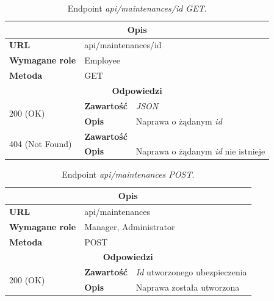 \documentclass[eng,printmode,openany]{mgr}
\begin{document}
\begin{table}[H]
	\caption{Endpoint \textit{api/maintenances/id GET}.}
	\begin{tabularx}{\textwidth}{|l|l|X|}
		\hline
		\multicolumn{3}{|c|}{\textbf{\textbf{Opis}}}
		\\ \hline
		\textbf{URL}                         & \multicolumn{2}{l|}{api/maintenances/id}
		\\ \hline
		\textbf{Wymagane role}               & \multicolumn{2}{l|}{Employee}
		\\ \hline
		\textbf{Metoda}                      & \multicolumn{2}{l|}{GET}
		\\ \hline
		\multicolumn{3}{|c|}{\textbf{Odpowiedzi}}
		\\ \hline
		\multirow{2}{*}{200 (OK)} 	        & \textbf{Zawartość}   	& \textit{JSON}
		\\ \cline{2-3}                      & \textbf{Opis}         	& Naprawa o żądanym \textit{id}
		\\ \hline
		\multirow{2}{*}{404 (Not Found)} 	& \textbf{Zawartość}     & 
		\\ \cline{2-3}                      & \textbf{Opis}          & Naprawa o żądanym \textit{id} nie istnieje
		\\ \hline
	\end{tabularx}
\end{table}

\begin{table}[H]
	\caption{Endpoint \textit{api/maintenances POST}.}
	\begin{tabularx}{\textwidth}{|l|l|X|}
		\hline
		\multicolumn{3}{|c|}{\textbf{\textbf{Opis}}}
		\\ \hline
		\textbf{URL}                       & \multicolumn{2}{l|}{api/maintenances}
		\\ \hline
		\textbf{Wymagane role}             & \multicolumn{2}{l|}{Manager, Administrator}
		\\ \hline
		\textbf{Metoda}                    & \multicolumn{2}{l|}{POST}
		\\ \hline
		\multicolumn{3}{|c|}{\textbf{Odpowiedzi}}
		\\ \hline
		\multirow{2}{*}{200 (OK)} 		& \textbf{Zawartość}     & \textit{Id} utworzonego ubezpieczenia
		\\ \cline{2-3}                  & \textbf{Opis}         	& Naprawa została utworzona
		\\ \hline
	\end{tabularx}
\end{table}
\end{document}
